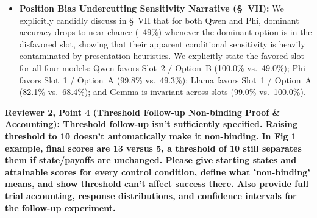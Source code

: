 \documentclass[11pt]{article}
\newcommand{\reviewercomment}[1]{\vspace{1em}\noindent\textbf{\textcolor{commentcolor}{#1}}}
\begin{document}
\begin{itemize}[leftmargin=*]
\item \textbf{Position Bias Undercutting Sensitivity Narrative (\S~VII):} We explicitly candidly discuss in \S~VII that for both Qwen and Phi, dominant accuracy drops to near-chance (~49\%) whenever the dominant option is in the disfavored slot, showing that their apparent conditional sensitivity is heavily contaminated by presentation heuristics. We explicitly state the favored slot for all four models: Qwen favors Slot~2 / Option~B (100.0\% vs.\ 49.0\%); Phi favors Slot~1 / Option~A (99.8\% vs.\ 49.3\%); Llama favors Slot~1 / Option~A (82.1\% vs.\ 68.4\%); and Gemma is invariant across slots (99.0\% vs.\ 100.0\%).
\end{itemize}

\reviewercomment{Reviewer 2, Point 4 (Threshold Follow-up Non-binding Proof \& Accounting): Threshold follow-up isn't sufficiently specified. Raising threshold to 10 doesn't automatically make it non-binding. In Fig 1 example, final scores are 13 versus 5, a threshold of 10 still separates them if state/payoffs are unchanged. Please give starting states and attainable scores for every control condition, define what 'non-binding' means, and show threshold can't affect success there. Also provide full trial accounting, response distributions, and confidence intervals for the follow-up experiment.}
\end{document}
